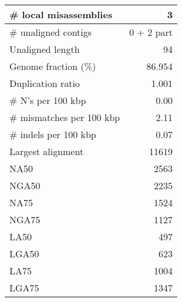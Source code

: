 \documentclass[12pt,a4paper]{article}
\begin{document}
\begin{table}[ht]
\begin{center}
\begin{tabular}{|l*{1}{|r}|}
\# local misassemblies & 3 \\ \hline
\# unaligned contigs & 0 + 2 part \\ \hline
Unaligned length & 94 \\ \hline
Genome fraction (\%) & 86.954 \\ \hline
Duplication ratio & 1.001 \\ \hline
\# N's per 100 kbp & 0.00 \\ \hline
\# mismatches per 100 kbp & 2.11 \\ \hline
\# indels per 100 kbp & 0.07 \\ \hline
Largest alignment & 11619 \\ \hline
NA50 & 2563 \\ \hline
NGA50 & 2235 \\ \hline
NA75 & 1524 \\ \hline
NGA75 & 1127 \\ \hline
LA50 & 497 \\ \hline
LGA50 & 623 \\ \hline
LA75 & 1004 \\ \hline
LGA75 & 1347 \\ \hline
\end{tabular}
\end{center}
\end{table}
\end{document}
